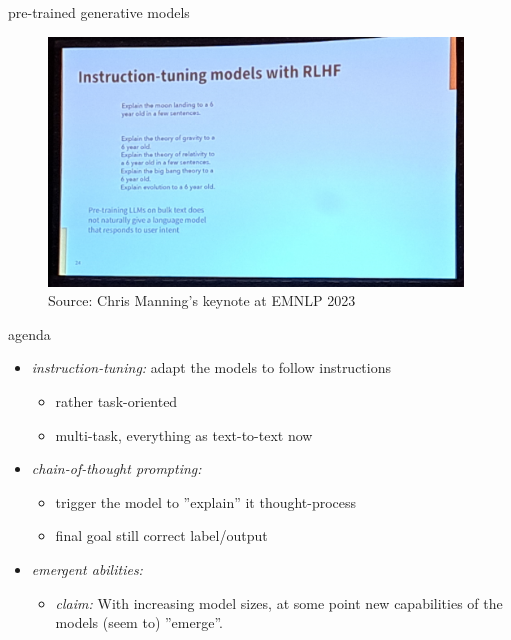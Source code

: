 \begin{frame}{pre-trained generative models}

\vfill
	
	\begin{figure}
		\centering
		\includegraphics[width = 11cm]{figure/manning.png}\\ 
		Source: Chris Manning's keynote at EMNLP 2023
	\end{figure}

\vfill

\end{frame}


\begin{frame}{agenda}

\vfill

\begin{itemize}
    \item \textit{instruction-tuning:} adapt the models to follow instructions
        \begin{itemize}
            \item rather task-oriented
            \item multi-task, everything as text-to-text now
        \end{itemize}
    \item \textit{chain-of-thought prompting:}
        \begin{itemize}
            \item trigger the model to ''explain'' it thought-process
            \item final goal still correct label/output
        \end{itemize}
    \item \textit{emergent abilities:}
        \begin{itemize}
            \item \textit{claim:} With increasing model sizes, at some point new capabilities of the models (seem to) ''emerge''.
        \end{itemize}
\end{itemize}

\vfill

\end{frame}

